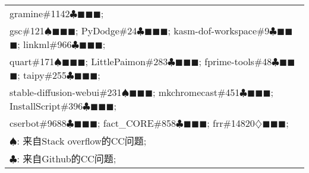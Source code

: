 \begin{table}[htbp]
\begin{tabular}{|l|}
		gramine\#1142{\color{Status2}$\clubsuit$}{\color{Status9}$\blacksquare$}{\color{Status10}$\blacksquare$}{\color{Status5}$\blacksquare$};
		\\
		gsc\#121{\color{Status1}$\spadesuit$}{\color{Status9}$\blacksquare$}{\color{Status10}$\blacksquare$}{\color{Status5}$\blacksquare$};
		PyDodge\#24{\color{Status2}$\clubsuit$}{\color{Status9}$\blacksquare$}{\color{Status10}$\blacksquare$}{\color{Status5}$\blacksquare$};
		kasm-dof-workspace\#9{\color{Status2}$\clubsuit$}{\color{Status9}$\blacksquare$}{\color{Status10}$\blacksquare$}{\color{Status5}$\blacksquare$};
		linkml\#966{\color{Status2}$\clubsuit$}{\color{Status9}$\blacksquare$}{\color{Status10}$\blacksquare$}{\color{Status5}$\blacksquare$};
		\\
		\rowcolor[HTML]{EFEFEF}
		quart\#171{\color{Status1}$\spadesuit$}{\color{Status9}$\blacksquare$}{\color{Status10}$\blacksquare$}{\color{Status5}$\blacksquare$};
		LittlePaimon\#283{\color{Status2}$\clubsuit$}{\color{Status9}$\blacksquare$}{\color{Status10}$\blacksquare$}{\color{Status5}$\blacksquare$};
		fprime-tools\#48{\color{Status2}$\clubsuit$}{\color{Status9}$\blacksquare$}{\color{Status10}$\blacksquare$}{\color{Status5}$\blacksquare$};
		taipy\#255{\color{Status2}$\clubsuit$}{\color{Status9}$\blacksquare$}{\color{Status10}$\blacksquare$}{\color{Status5}$\blacksquare$};
		\\
		stable-diffusion-webui\#231{\color{Status1}$\spadesuit$}{\color{Status9}$\blacksquare$}{\color{Status10}$\blacksquare$}{\color{Status5}$\blacksquare$};
		mkchromecast\#451{\color{Status2}$\clubsuit$}{\color{Status9}$\blacksquare$}{\color{Status10}$\blacksquare$}{\color{Status5}$\blacksquare$};
		InstallScript\#396{\color{Status2}$\clubsuit$}{\color{Status9}$\blacksquare$}{\color{Status10}$\blacksquare$}{\color{Status5}$\blacksquare$};
		\\
		\rowcolor[HTML]{EFEFEF}
		cserbot\#9688{\color{Status2}$\clubsuit$}{\color{Status9}$\blacksquare$}{\color{Status10}$\blacksquare$}{\color{Status5}$\blacksquare$};
		fact\_CORE\#858{\color{Status2}$\clubsuit$}{\color{Status9}$\blacksquare$}{\color{Status10}$\blacksquare$}{\color{Status5}$\blacksquare$};
		frr\#14820{\color{Status4}$\diamondsuit$}{\color{Status9}$\blacksquare$}{\color{Status10}$\blacksquare$}{\color{Status5}$\blacksquare$};
		\\
		\hline
		\multicolumn{1}{l}{{\color{Status1}$\spadesuit$}: 来自Stack overflow的CC问题; }\\
		\multicolumn{1}{l}{{\color{Status2}$\clubsuit$}: 来自Github的CC问题;} \\

\end{tabular}
\end{table}
